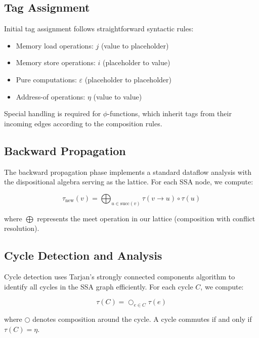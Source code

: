 \documentclass[journal]{IEEEtran}
\begin{document}
\subsection{Tag Assignment}

Initial tag assignment follows straightforward syntactic rules:

\begin{itemize}
\item Memory load operations: $j$ (value to placeholder)
\item Memory store operations: $i$ (placeholder to value)
\item Pure computations: $\varepsilon$ (placeholder to placeholder)
\item Address-of operations: $\eta$ (value to value)
\end{itemize}

Special handling is required for $\phi$-functions, which inherit tags from their incoming edges according to the composition rules.

\subsection{Backward Propagation}

The backward propagation phase implements a standard dataflow analysis with the dispositional algebra serving as the lattice. For each SSA node, we compute:

\begin{equation}
\tau_{\text{new}}(v) = \bigoplus_{u \in \text{succ}(v)} \tau(v \to u) \circ \tau(u)
\end{equation}

where $\bigoplus$ represents the meet operation in our lattice (composition with conflict resolution).

\subsection{Cycle Detection and Analysis}

Cycle detection uses Tarjan's strongly connected components algorithm to identify all cycles in the SSA graph efficiently. For each cycle $C$, we compute:

\begin{equation}
\tau(C) = \bigcirc_{e \in C} \tau(e)
\end{equation}

where $\bigcirc$ denotes composition around the cycle. A cycle commutes if and only if $\tau(C) = \eta$.
\end{document}
